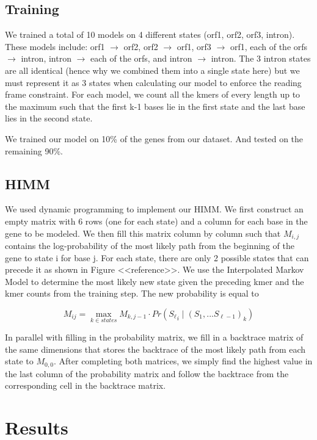 \documentclass[11pt,letterpaper]{article}
\begin{document}
\subsection{Training}
We trained a total of 10 models on 4 different states (orf1, orf2, orf3, intron). These models include: orf1 $\rightarrow$ orf2, orf2 $\rightarrow$ orf1, orf3 $\rightarrow$ orf1, each of the orfs  $\rightarrow$  intron, intron  $\rightarrow$ each of the orfs, and intron  $\rightarrow$  intron. The 3 intron states are all identical (hence why we combined them into a single state here) but we must represent it as 3 states when calculating our model to enforce the reading frame constraint. For each model, we count all the kmers of every length up to the maximum such that the first k-1 bases lie in the first state and the last base lies in the second state.

We trained our model on 10\% of the genes from our dataset. And tested on the remaining 90\%.

\subsection{HIMM}
We used dynamic programming to implement our HIMM. We first construct an empty matrix with 6 rows (one for each state) and a column for each base in the gene to be modeled. We then fill this matrix column by column such that $M_{i,j}$ contains the log-probability of the most likely path from the beginning of the gene to state i for base j. For each state, there are only 2 possible states that can precede it as shown in Figure <<reference>>. We use the Interpolated Markov Model to determine the most likely new state given the preceding kmer and the kmer counts from the training step. The new probability is equal to

$$M_{ij} = \max_{k \in states} M_{k,j-1} \cdot Pr\left({S_\ell}_i \mid \left( S_1,...S_{\ell-1}  \right)_k \right)$$

 In parallel with filling in the probability matrix, we fill in a backtrace matrix of the same dimensions that stores the backtrace of the most likely path from each state to $M_{0,0}$. After completing both matrices, we simply find the highest value in the last column of the probability matrix and follow the backtrace from the corresponding cell in the backtrace matrix.



\section{Results}
\end{document}
